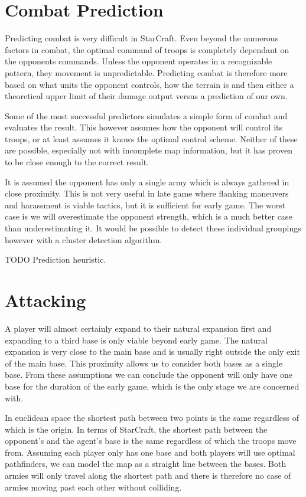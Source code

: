 \section{Combat Prediction}
Predicting combat is very difficult in StarCraft. Even beyond the numerous factors in combat, the optimal command of troops is completely dependant on the opponents commands. Unless the opponent operates in a recognizable pattern, they movement is unpredictable. Predicting combat is therefore more based on what units the opponent controls, how the terrain is and then either a theoretical upper limit of their damage output versus a prediction of our own.

Some of the most successful predictors simulates a simple form of combat and evaluates the result. This however assumes how the opponent will control its troops, or at least assumes it knows the optimal control scheme. Neither of these are possible, especially not with incomplete map information, but it has proven to be close enough to the correct result.

It is assumed the opponent has only a single army which is always gathered in close proximity. This is not very useful in late game where flanking maneuvers and harassment is viable tactics, but it is sufficient for early game. The worst case is we will overestimate the opponent strength, which is a much better case than underestimating it. It would be possible to detect these individual groupings however with a cluster detection algorithm.

TODO Prediction heuristic.

\section{Attacking}
\label{sec:attacking}
A player will almost certainly expand to their natural expansion first and expanding to a third base is only viable beyond early game. The natural expansion is very close to the main base and is usually right outside the only exit of the main base. This proximity allows us to consider both bases as a single base. From these assumptions we can conclude the opponent will only have one base for the duration of the early game, which is the only stage we are concerned with.

In euclidean space the shortest path between two points is the same regardless of which is the origin. In terms of StarCraft, the shortest path between the opponent's and the agent's base is the same regardless of which the troops move from. Assuming each player only has one base and both players will use optimal pathfinders, we can model the map as a straight line between the bases. Both armies will only travel along the shortest path and there is therefore no case of armies moving past each other without colliding.

